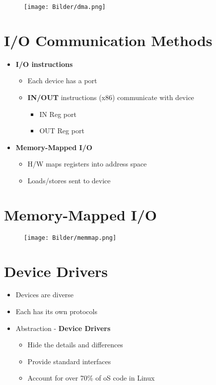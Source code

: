 \documentclass[a4paper,11pt,english]{article}
\begin{document}
\begin{figure}[H]
    \centering
    \texttt{[image: Bilder/dma.png]}
\end{figure}

\section*{I/O Communication Methods}
\begin{itemize}
    \item \textbf{\color{blue} I/O instructions}
        \begin{itemize}
            \item Each device has a port 
            \item \textbf{\color{blue} IN/OUT} instructions (x86) communicate with device
                \begin{itemize}
                    \item IN Reg port
                    \item OUT Reg port
                \end{itemize}
        \end{itemize}
    \item \textbf{\color{blue} Memory-Mapped I/O}
        \begin{itemize}
            \item H/W maps registers into address space
            \item Loads/stores sent to device
        \end{itemize}
\end{itemize}

\section*{Memory-Mapped I/O}
\begin{figure}[H]
    \centering 
    \texttt{[image: Bilder/memmap.png]}
\end{figure}

\section*{Device Drivers}
\begin{itemize}
    \item Devices are diverse
    \item Each has its own protocols
    \item Abstraction - \textbf{\color{blue} Device Drivers}
        \begin{itemize}
            \item Hide the details and differences
            \item Provide standard interfaces
            \item Account for over 70\% of oS code in Linux
        \end{itemize}
\end{itemize}
\end{document}
